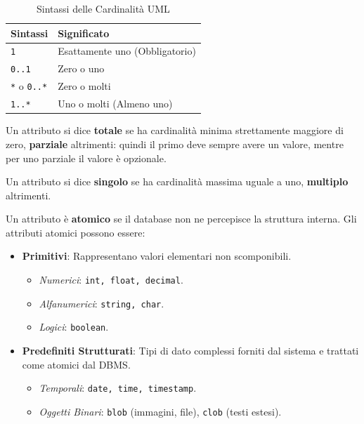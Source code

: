 \begin{table}[h]
    \centering
    \caption{Sintassi delle Cardinalità UML}
    \begin{tabular}{@{}ll@{}}
        \toprule
        \textbf{Sintassi} & \textbf{Significato} \\
        \midrule
        \texttt{1} & Esattamente uno (Obbligatorio) \\
        \texttt{0..1} & Zero o uno \\
        \texttt{*} o \texttt{0..*} & Zero o molti \\
        \texttt{1..*} & Uno o molti (Almeno uno) \\
        \bottomrule
    \end{tabular}
\end{table}

Un attributo si dice \textbf{totale} se ha cardinalità minima strettamente maggiore di zero, \textbf{parziale} altrimenti: quindi il primo deve sempre avere un valore, mentre per uno parziale il valore è opzionale. 

Un attributo si dice \textbf{singolo} se ha cardinalità massima uguale a uno, \textbf{multiplo} altrimenti.
\vspace{\baselineskip}

Un attributo è \textbf{atomico} se il database non ne percepisce la struttura interna. Gli attributi atomici possono essere:

\begin{itemize}
    \item \textbf{Primitivi}: Rappresentano valori elementari non scomponibili.
    \begin{itemize}
        \item \textit{Numerici}: \texttt{int, float, decimal}.
        \item \textit{Alfanumerici}: \texttt{string, char}.
        \item \textit{Logici}: \texttt{boolean}.
    \end{itemize}
    \item \textbf{Predefiniti Strutturati}: Tipi di dato complessi forniti dal sistema e trattati come atomici dal DBMS.
    \begin{itemize}
        \item \textit{Temporali}: \texttt{date, time, timestamp}.
        \item \textit{Oggetti Binari}: \texttt{blob} (immagini, file), \texttt{clob} (testi estesi).
    \end{itemize}
\end{itemize}
\vspace{\baselineskip}

